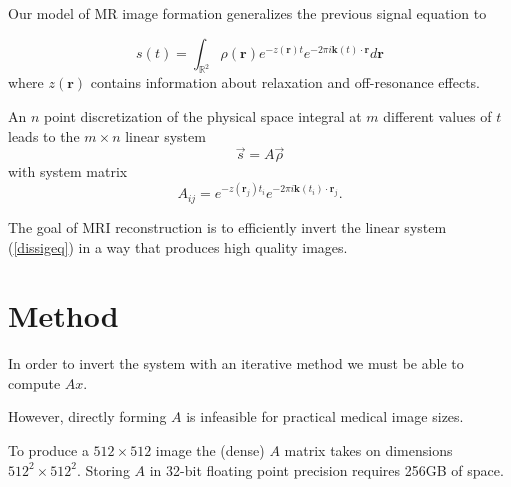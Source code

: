 \documentclass[xcolor=dvipsnames]{beamer}
\newcommand*{\sectionpage}{\usebeamertemplate*{section page}}
\theoremstyle{remark}
\begin{document}
\begin{frame}

Our model of MR image formation generalizes the previous signal equation to 

\begin{equation}%
s(t) = \int_{\mathbb{R}^2} \rho(\mathbf{r})e^{-z(\mathbf{r})t}e^{-2\pi i \mathbf{k}(t) \cdot \mathbf{r}} d\mathbf{r}
\end{equation}
where $z(\mathbf{r})$ contains information about relaxation and off-resonance effects.

\end{frame}

\begin{frame}

An $n$ point discretization of the physical space integral at $m$ different values of $t$ leads to the $m \times n$ linear system
\begin{equation}\label{dissigeq}
\vec{s} = A \vec{\rho}
\end{equation}
with system matrix
\begin{equation}\label{aij}
A_{ij} = e^{-z(\mathbf{r}_j)t_i}e^{-2\pi i \mathbf{k}(t_i) \cdot \mathbf{r}_j}.
\end{equation}

\pause

The goal of MRI reconstruction is to efficiently invert the linear system (\ref{dissigeq}) in a way that produces high quality images.

\end{frame}

\section{Method}
\frame{\sectionpage}


\begin{frame}

In order to invert the system with an iterative method we must be able to compute $Ax$.

\pause

However, directly forming $A$ is infeasible for practical medical image sizes.

To produce a $512 \times 512$ image the (dense) $A$ matrix takes on dimensions $512^2 \times 512^2$. Storing $A$ in 32-bit floating point precision requires 256GB of space.

\end{frame}
\end{document}
